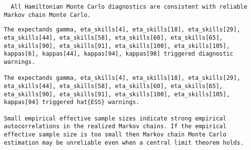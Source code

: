 \documentclass[
  letterpaper,
  DIV=11,
  numbers=noendperiod]{scrartcl}
\newenvironment{Shaded}{\begin{snugshade}}{\end{snugshade}}
\newcommand{\AttributeTok}[1]{\textcolor[rgb]{0.40,0.45,0.13}{#1}}
\newcommand{\ConstantTok}[1]{\textcolor[rgb]{0.56,0.35,0.01}{#1}}
\newcommand{\FunctionTok}[1]{\textcolor[rgb]{0.28,0.35,0.67}{#1}}
\newcommand{\NormalTok}[1]{\textcolor[rgb]{0.00,0.23,0.31}{#1}}
\newcommand{\OtherTok}[1]{\textcolor[rgb]{0.00,0.23,0.31}{#1}}
\newcommand{\SpecialCharTok}[1]{\textcolor[rgb]{0.37,0.37,0.37}{#1}}
\newcommand{\StringTok}[1]{\textcolor[rgb]{0.13,0.47,0.30}{#1}}
\begin{document}
\begin{verbatim}
  All Hamiltonian Monte Carlo diagnostics are consistent with reliable
Markov chain Monte Carlo.
\end{verbatim}

\begin{Shaded}
\end{Shaded}

\begin{verbatim}
The expectands gamma, eta_skills[4], eta_skills[18], eta_skills[29],
eta_skills[44], eta_skills[58], eta_skills[60], eta_skills[65],
eta_skills[90], eta_skills[91], eta_skills[100], eta_skills[105],
kappas[6], kappas[44], kappas[94], kappas[98] triggered diagnostic
warnings.

The expectands gamma, eta_skills[4], eta_skills[18], eta_skills[29],
eta_skills[44], eta_skills[58], eta_skills[60], eta_skills[65],
eta_skills[90], eta_skills[91], eta_skills[100], eta_skills[105],
kappas[94] triggered hat{ESS} warnings.

Small empirical effective sample sizes indicate strong empirical
autocorrelations in the realized Markov chains. If the empirical
effective sample size is too small then Markov chain Monte Carlo
estimation may be unreliable even when a central limit theorem holds.
\end{verbatim}
\end{document}
